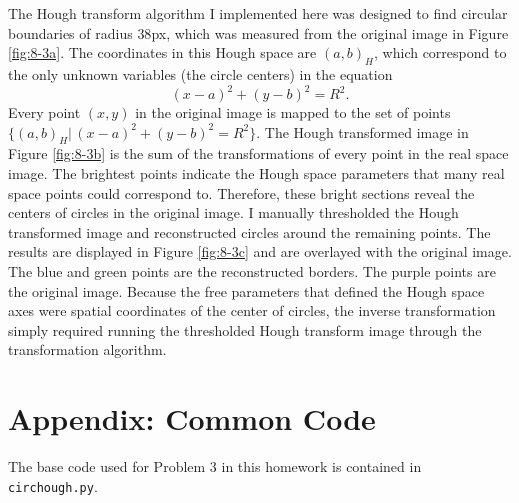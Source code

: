 \documentclass[aps,letterpaper,10pt]{article}
\newcommand{\ttt}{\texttt}
\begin{document}
The Hough transform algorithm I implemented here was designed to find circular boundaries of radius $38$px, which was measured from the original image in Figure \ref{fig:8-3a}.  The coordinates in this Hough space are $(a,b)_H$, which correspond to the only unknown variables (the circle centers) in the equation $$(x-a)^2+(y-b)^2=R^2.$$
Every point $(x,y)$ in the original image is mapped to the set of points $\{(a,b)_H |\, (x-a)^2+(y-b)^2=R^2\}$.  The Hough transformed image in Figure \ref{fig:8-3b} is the sum of the transformations of every point in the real space image.  The brightest points indicate the Hough space parameters that many real space points could correspond to.  Therefore, these bright sections reveal the centers of circles in the original image.  I manually thresholded the Hough transformed image and reconstructed circles around the remaining points.  The results are displayed in Figure \ref{fig:8-3c} and are overlayed with the original image.  The blue and green points are the reconstructed borders.  The purple points are the original image.  Because the free parameters that defined the Hough space axes were spatial coordinates of the center of circles, the inverse transformation simply required running the thresholded Hough transform image through the transformation algorithm.



\section{Appendix: Common Code}
The base code used for Problem 3 in this homework is contained in \ttt{circhough.py}.

\end{document}
